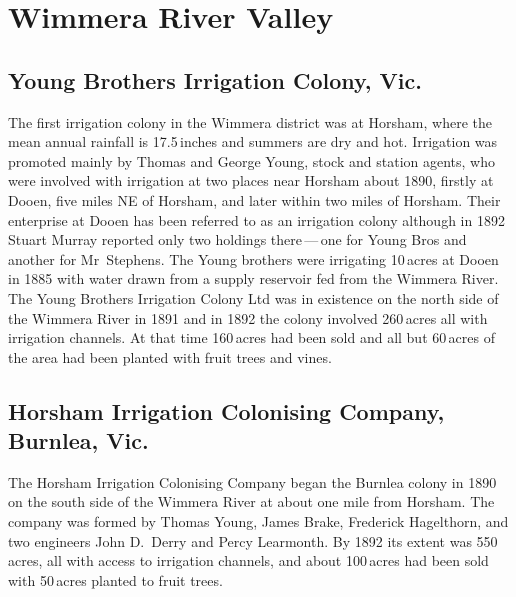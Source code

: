 \section*{Wimmera River Valley}

\subsection*{Young Brothers Irrigation Colony, Vic.}

The first irrigation colony in the Wimmera
district was at Horsham, where the mean annual rainfall is
17.5\,inches and summers are dry and hot.  Irrigation was promoted
mainly by Thomas and George Young,  stock and
station agents, who were involved with irrigation at two places near
Horsham about 1890, firstly at Dooen,   five miles
NE of Horsham, and later within two miles of Horsham.  Their
enterprise at Dooen has been referred to as an irrigation colony
although in 1892 Stuart Murray reported only two holdings
there\,---\,one for Young Bros and another for Mr~Stephens.  The Young
brothers were irrigating 10\,acres at Dooen in 1885 with water drawn
from a supply reservoir fed from the
Wimmera River.  The Young Brothers Irrigation Colony Ltd was in
existence on the north side of the Wimmera River in 1891 and in 1892
the colony involved 260\,acres all with irrigation
channels.  At that time 160\,acres had been
sold and all but 60\,acres of the area had been planted with
fruit trees and
vines.

\subsection*{Horsham Irrigation Colonising Company, Burnlea, Vic.}

The Horsham Irrigation Colonising Company began the Burnlea colony in
1890 on the south side of the Wimmera River at
about one mile from Horsham.  The company was formed by Thomas Young,
James Brake, Frederick Hagelthorn, and two engineers John D.~Derry and
Percy Learmonth.  By 1892 its extent was 550\,acres, all with access
to irrigation channels, and about
100\,acres had been sold with 50\,acres planted to fruit
trees.

